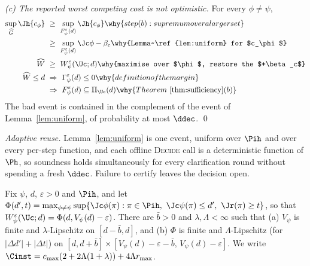 \emph{(c) The reported worst competing cost is not optimistic.} For every
$\phi\ne\psi$,
\begin{align*}
\sup_{\widehat G}\Jh{c_\phi}\ &\ge\ \sup_{F^\varepsilon_\psi(d)}\Jh{c_\phi}
   \why{step (b): supremum over a larger set}\\
   &\ge\ \sup_{F^\varepsilon_\psi(d)}\Jc\phi-\beta_c
   \why{Lemma~\ref{lem:uniform} for $c_\phi$}\\
\widehat W\ &\ge\ W^\varepsilon_\psi(\Uc;d)
   \why{maximise over $\phi$, restore the $+\beta_c$}\\
\widehat W\le d\ &\Rightarrow\ \Gamma^\varepsilon_\psi(d)\le0
   \why{definition of the margin}\\
   &\Rightarrow\ F^\varepsilon_\psi(d)\subseteq\Pi_{\Uc}(d)
   \why{Theorem~\ref{thm:sufficiency}(b)}
\end{align*}
The bad event is contained in the complement of the event of
Lemma~\ref{lem:uniform}, of probability at most $\ddec$. \qed

\noindent \emph{Adaptive reuse.} Lemma~\ref{lem:uniform} is one event, uniform over
$\Pih$ and over every per-step function, and each offline \textsc{Decide} call is a
deterministic function of $\Ph$, so soundness holds simultaneously for every clarification
round without spending a fresh $\ddec$. Failure to certify leaves the decision open.

\begin{assumption}[Regularity]
\label{ass:reg}
Fix $\psi$, $d$, $\varepsilon>0$ and $\Pih$, and let
$\Phi(d',t)=\max_{\phi\ne\psi}\sup\{\Jc\phi(\pi):\pi\in\Pih,\ \Jc\psi(\pi)\le d',\ \Jr(\pi)\ge t\}$,
so that $W^\varepsilon_\psi(\Uc;d)=\Phi(d,V_\psi(d)-\varepsilon)$. There are
$\bar b>0$ and $\lambda,\Lambda<\infty$ such that (a) $V_\psi$ is finite and
$\lambda$-Lipschitz on $[d-\bar b,d]$, and (b) $\Phi$ is finite and
$\Lambda$-Lipschitz (for $|\Delta d'|+|\Delta t|$) on
$[d,d+\bar b]\times[V_\psi(d)-\varepsilon-\bar b,\,V_\psi(d)-\varepsilon]$.
We write $\Cinst=c_{\max}(2+2\Lambda(1+\lambda))+4\Lambda r_{\max}$.
\end{assumption}

